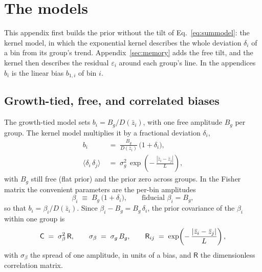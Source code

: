 
\section{The models}
\label{sec:models}

This appendix first builds the prior without the tilt of
Eq.~\eqref{eq:summodel}: the kernel model, in which the exponential
kernel describes the whole deviation $\delta_i$ of a bin from its
group's trend.  Appendix~\ref{sec:memory} adds the free tilt, and the
kernel then describes the residual $\varepsilon_i$ around each group's
line.  In the appendices $b_i$ is the linear bias $b_{1,i}$ of bin $i$.

\subsection{Growth-tied, free, and correlated biases}
\label{sec:defs}

The growth-tied model sets $b_i = B_g/D(\bar{z}_i)$, with one free
amplitude $B_g$ per group.  The kernel model multiplies it by a
fractional deviation $\delta_i$,
\begin{align}
  b_i &\;=\; \frac{B_g}{D(\bar{z}_i)}\,\bigl(1 + \delta_i\bigr),
  \label{eq:model}
  \\
  \bigl\langle \delta_i\,\delta_j \bigr\rangle
  &\;=\; \sigma_g^2\,
  \exp\!\left(-\,\frac{|\bar{z}_i - \bar{z}_j|}{L}\right),
  \label{eq:priorkernel}
\end{align}
with $B_g$ still free (flat prior) and the prior zero across groups.
In the Fisher matrix the convenient parameters are the per-bin
amplitudes
\begin{equation}
  \beta_i \;\equiv\; B_g\,\bigl(1 + \delta_i\bigr),
  \qquad \text{fiducial } \beta_i = B_g,
  \label{eq:beta}
\end{equation}
so that $b_i = \beta_i / D(\bar{z}_i)$.  Since
$\beta_i - B_g = B_g\,\delta_i$, the prior covariance of the $\beta_i$
within one group is
\begin{equation}
  \mathsf{C} \;=\; \sigma_\beta^2\,\mathsf{R},
  \qquad
  \sigma_\beta \;=\; \sigma_g\,B_g,
  \qquad
  \mathsf{R}_{ij} \;=\; \exp\!\left(-\,\frac{|\bar{z}_i - \bar{z}_j|}{L}\right),
  \label{eq:covdef}
\end{equation}
with $\sigma_\beta$ the spread of one amplitude, in units of a bias, and
$\mathsf{R}$ the dimensionless correlation matrix.

